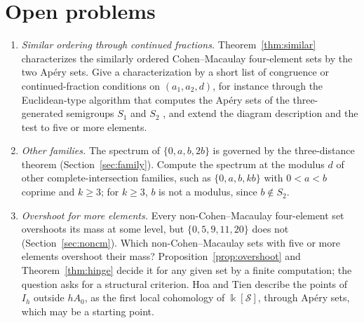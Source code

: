 \section{Open problems}\label{sec:open}

\begin{enumerate}
\item \emph{Similar ordering through continued fractions.} Theorem~\ref{thm:similar} characterizes the similarly ordered Cohen--Macaulay four-element sets by the two Ap\'ery sets. Give a characterization by a short list of congruence or continued-fraction conditions on $(a_1,a_2,d)$, for instance through the Euclidean-type algorithm that computes the Ap\'ery sets of the three-generated semigroups $S_1$ and $S_2$ \cite{Rodseth1978}, and extend the diagram description and the test to five or more elements.
\item \emph{Other families.} The spectrum of $\{0,a,b,2b\}$ is governed by the three-distance theorem (Section~\ref{sec:family}). Compute the spectrum at the modulus $d$ of other complete-intersection families, such as $\{0,a,b,kb\}$ with $0<a<b$ coprime and $k\ge3$; for $k\ge3$, $b$ is not a modulus, since $b\notin S_2$.
\item \emph{Overshoot for more elements.} Every non-Cohen--Macaulay four-element set overshoots its mass at some level, but $\{0,5,9,11,20\}$ does not (Section~\ref{sec:noncm}). Which non-Cohen--Macaulay sets with five or more elements overshoot their mass? Proposition~\ref{prop:overshoot} and Theorem~\ref{thm:hinge} decide it for any given set by a finite computation; the question asks for a structural criterion. Hoa and Tien \cite[Thm.~4.4]{HoaTien2026} describe the points of $I_h$ outside $hA_0$, as the first local cohomology of $\Bbbk[\mathcal S]$, through Ap\'ery sets, which may be a starting point.
\end{enumerate}
